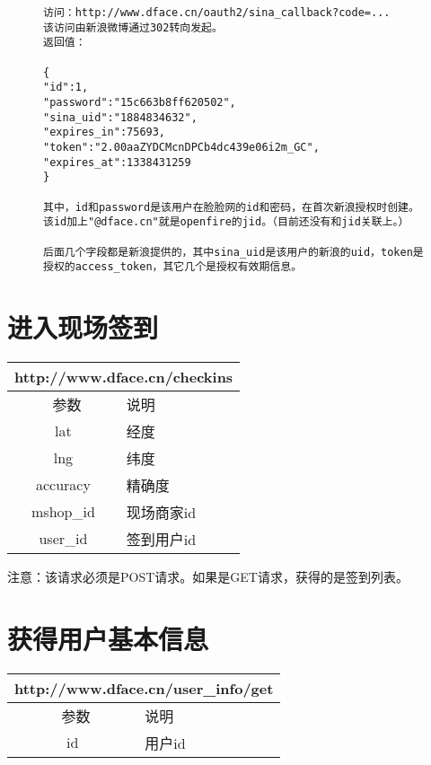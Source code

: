 \documentclass[cs4size]{ctexartutf8}
\begin{document}
\begin{figure}[H]
\begin{verbatim}
访问：http://www.dface.cn/oauth2/sina_callback?code=...
该访问由新浪微博通过302转向发起。
返回值：

{
"id":1,
"password":"15c663b8ff620502",
"sina_uid":"1884834632",
"expires_in":75693,
"token":"2.00aaZYDCMcnDPCb4dc439e06i2m_GC",
"expires_at":1338431259
}

其中，id和password是该用户在脸脸网的id和密码，在首次新浪授权时创建。该id加上"@dface.cn"就是openfire的jid。（目前还没有和jid关联上。）

后面几个字段都是新浪提供的，其中sina_uid是该用户的新浪的uid，token是授权的access_token，其它几个是授权有效期信息。

\end{verbatim}
\end{figure}


\section{进入现场签到}

\begin{table}[H]
   \begin{center}
\begin{tabular}{|c|p{12cm}|}
\hline
\multicolumn{2}{|c|}{http://www.dface.cn/checkins} \\
\hline\hline
 \  参数  &  说明  \\
\hline
 lat  &  经度\\
\hline
 lng  &  纬度\\ 
\hline
 accuracy  &  精确度\\ 
\hline
 mshop\_id  &  现场商家id\\ 
\hline
 user\_id  &  签到用户id\\ 
\hline
\end{tabular}
   \end{center}
\end{table}

注意：该请求必须是POST请求。如果是GET请求，获得的是签到列表。



\section{获得用户基本信息}

\begin{table}[H]
   \begin{center}
\begin{tabular}{|c|p{12cm}|}
\hline
\multicolumn{2}{|c|}{http://www.dface.cn/user\_info/get} \\
\hline\hline
 \  参数  &  说明  \\
\hline
 id  &  用户id\\
\hline
\end{tabular}
   \end{center}
\end{table}
\end{document}
